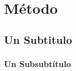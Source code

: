 


\section{Método}
\subsection{Un Subtitulo}
\lipsum[1]
\subsubsection{Un Subsubtítulo}
\lipsum[1]
